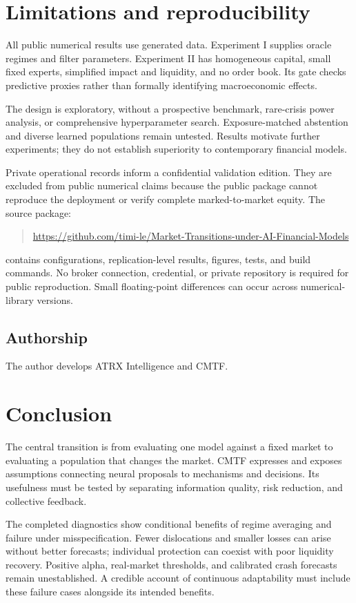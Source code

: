\section{Limitations and reproducibility}
All public numerical results use generated data. Experiment I supplies oracle regimes and filter parameters. Experiment II has homogeneous capital, small fixed experts, simplified impact and liquidity, and no order book. Its gate checks predictive proxies rather than formally identifying macroeconomic effects.

The design is exploratory, without a prospective benchmark, rare-crisis power analysis, or comprehensive hyperparameter search. Exposure-matched abstention and diverse learned populations remain untested. Results motivate further experiments; they do not establish superiority to contemporary financial models.

Private operational records inform a confidential validation edition. They are excluded from public numerical claims because the public package cannot reproduce the deployment or verify complete marked-to-market equity. The source package: \begin{quote}
\small\raggedright
\def\UrlBreaks{\do\/\do-}
\url{https://github.com/timi-le/Market-Transitions-under-AI-Financial-Models}\end{quote} contains configurations, replication-level results, figures, tests, and build commands. No broker connection, credential, or private repository is required for public reproduction. Small floating-point differences can occur across numerical-library versions.

\subsection{Authorship}
The author develops ATRX Intelligence and CMTF.

\section{Conclusion}
The central transition is from evaluating one model against a fixed market to evaluating a population that changes the market. CMTF expresses and exposes assumptions connecting neural proposals to mechanisms and decisions. Its usefulness must be tested by separating information quality, risk reduction, and collective feedback.

The completed diagnostics show conditional benefits of regime averaging and failure under misspecification. Fewer dislocations and smaller losses can arise without better forecasts; individual protection can coexist with poor liquidity recovery. Positive alpha, real-market thresholds, and calibrated crash forecasts remain unestablished. A credible account of continuous adaptability must include these failure cases alongside its intended benefits.

